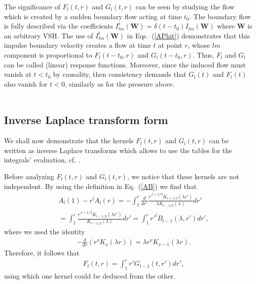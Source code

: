 \documentclass[aps,prx,twocolumn,amsmath,amssymb,amsfonts]{revtex4-2}
\begin{document}
The significance of $F_l(t, r)$ and $G_l(t, r)$ can be seen by studying the flow which is created by a sudden boundary flow acting at time $t_0$. The boundary flow is fully described via the coefficients $I^t_{lm}(\bm W)=\delta(t-t_0)I_{lm}(\bm W)$ where $\bm W$ is an arbitrary VSH. The use of $I^t_{lm}(\bm W)$ in Eqs.~(\ref{APhit}) demonstrates that this impulse boundary velocity creates a flow at time $t$ at point $r$, whose $lm$ component is proportional to $F_l(t-t_0, r)$ and $G_l(t-t_0, r)$. Thus, $F_l$ and $G_l$ can be called (linear) response functions. Moreover, since the induced flow must vanish at $t<t_0$ by causality, then consistency demands that $G_l(t)$ and $F_l(t)$ also vanish for $t<0$, similarly as for the pressure above. \\ \\






\subsection{Inverse Laplace transform form}

We shall now demonstrate that the kernels $F_l(t, r)$ and $G_l(t, r)$ can be written as inverse Laplace transforms which allows to use the tables for the integrals' evaluation, cf. \cite{Ishimoto}.

Before analyzing $F_l(t, r)$ and $G_l(t, r)$, we notice that these kernels are not independent. By using the definition in Eq.~(\ref{AB}) we find that
\begin{eqnarray}&&\!\!\!\!\!
A_{l}(1)\!-\!r^l A_{l}(r)=-\int_1^r \frac{d}{dr'}\frac{r'^{l+1/2}K_{l+1/2}(\lambda r')}{\lambda K_{l-1/2}(\lambda)}dr'
\nonumber\\&&\!\!\!\!\!
=\int_1^r \frac{r'^{l+1/2}K_{l-1/2}(\lambda r')}{K_{l-1/2}(\lambda)}dr'=\!\int_1^r r'^l B_{l-1}(\lambda, r')dr',
\end{eqnarray}
where we used the identity \cite{grad}
\begin{eqnarray}&&
-\frac{d}{dr}\left( r^{\nu}K_{\nu}(\lambda r)\right)=\lambda r^{\nu}K_{\nu-1}(\lambda r). \label{idr}
\end{eqnarray}
Therefore, it follows that
\begin{eqnarray}&&
F_l(t, r)=\int_1^r r' G_{l-1}(t, r')dr', \label{unf}
\end{eqnarray}
using which one kernel could be deduced from the other.
\end{document}
